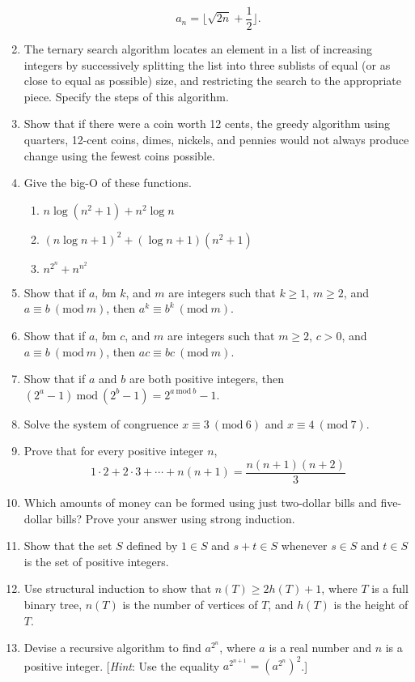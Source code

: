 \documentclass[11pt]{article}
\newcommand{\PMod}[1]{\ (\mathrm{mod}\ #1)}
\newcommand{\Mod}[1]{\ \mathrm{mod}\ #1}
\begin{document}
\begin{enumerate}
    \[a_n = \lfloor \sqrt{2n} + \frac{1}{2} \rfloor.\]
    \item The ternary search algorithm locates an element in a list of increasing integers by successively splitting the list into three sublists of equal (or as close to equal as possible) size, and restricting the search to the appropriate piece. Specify the steps of this algorithm.
    \item Show that if there were a coin worth 12 cents, the greedy algorithm using quarters, 12-cent coins, dimes, nickels, and pennies would not always produce change using the fewest coins possible.
    \item Give the big-O of these functions.
    \begin{enumerate}
        \item $n \log(n^2 + 1) + n^2\log n$
        \item $(n\log n + 1)^2 + (\log n + 1)(n^2 + 1)$
        \item $n^{2^n} + n^{n^2}$
    \end{enumerate}
    \item Show that if $a$, $b$m $k$, and $m$ are integers such that $k \geq 1$, $m \geq 2$, and $a \equiv b \PMod{m}$, then $a^k \equiv b^k \PMod{m}$.
    \item Show that if $a$, $b$m $c$, and $m$ are integers such that $m \geq 2$, $c > 0$, and $a \equiv b \PMod{m}$, then $ac \equiv bc \PMod{m}$.
    \item Show that if $a$ and $b$ are both positive integers, then $(2^a - 1) \Mod{(2^b - 1)} = 2^{a \Mod{b}} - 1$.
    \item Solve the system of congruence $x \equiv 3 \PMod{6}$ and $x \equiv 4 \PMod{7}$.
    \item Prove that for every positive integer $n$,
    \[1 \cdot 2 + 2 \cdot 3 + \cdots + n(n + 1) = \frac{n(n + 1)(n + 2)}{3}\]
    \item Which amounts of money can be formed using just two-dollar bills and five-dollar bills? Prove your answer using strong induction.
    \item Show that the set $S$ defined by $1 \in S$ and $s + t \in S$ whenever $s \in S$ and $t \in S$ is the set of positive integers.
    \item Use structural induction to show that $n(T) \geq 2h(T) + 1$, where $T$ is a full binary tree, $n(T)$ is the number of vertices of $T$, and $h(T)$ is the height of $T$.
    \item Devise a recursive algorithm to find $a^{2^n}$, where $a$ is a real number and $n$ is a positive integer. [\textit{Hint}: Use the equality $a^{2^{n+1}} = (a^{2^n})^2$.]
\end{enumerate}
\end{document}
